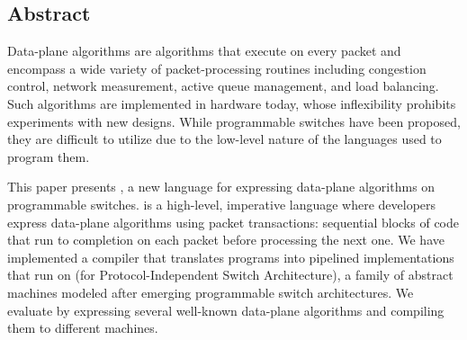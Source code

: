 \subsection*{Abstract}

Data-plane algorithms are algorithms that execute on every packet and encompass
a wide variety of packet-processing routines including congestion control,
network measurement, active queue management, and load balancing. Such 
algorithms are implemented in hardware today, whose inflexibility prohibits
experiments with new designs. While programmable switches have been proposed, 
they are difficult to utilize due to the low-level nature of the languages
used to program them.

This paper presents \pktlanguage, a new language for expressing data-plane
algorithms on programmable switches. \pktlanguage is a high-level, imperative
language where developers express data-plane algorithms using packet
transactions: sequential blocks of code that run to completion on each packet
before processing the next one. We have implemented a compiler that translates
\pktlanguage programs into pipelined implementations that run on \absmachine
(for Protocol-Independent Switch Architecture), a family of abstract machines
modeled after emerging programmable switch architectures. We evaluate
\pktlanguage by expressing several well-known data-plane algorithms and
compiling them to different \absmachine machines.
